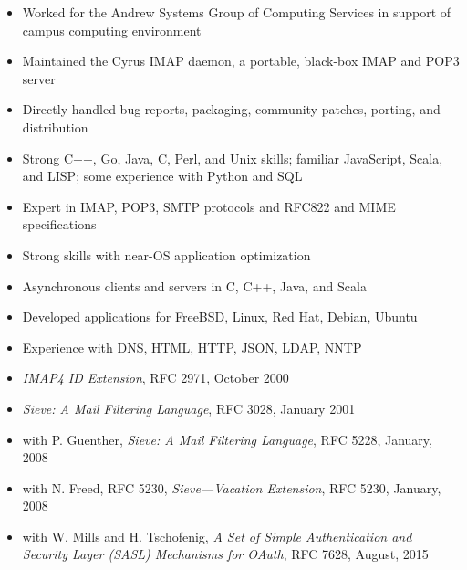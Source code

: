\documentclass[letterpaper,11pt,twoside]{article}
\begin{document}
\vspace{-11pt}
\begin{itemize}
\item Worked for the Andrew Systems Group of Computing Services in
  support of campus computing environment
\item Maintained the Cyrus IMAP daemon, a portable, black-box IMAP and
  POP3 server
\item Directly handled bug reports, packaging, community patches,
  porting, and distribution
\end{itemize}


\vspace{-6pt}
\begin{itemize}
\item Strong C++, Go, Java, C, Perl, and Unix skills; familiar JavaScript,
  Scala, and LISP; some experience with Python and SQL
\item Expert in IMAP, POP3, SMTP protocols and RFC822 and MIME specifications
\item Strong skills with near-OS application optimization
\item Asynchronous clients and servers in C, C++, Java, and Scala
\item Developed applications for FreeBSD, Linux, Red Hat, Debian, Ubuntu
\item Experience with DNS, HTML, HTTP, JSON, LDAP, NNTP
\end{itemize}

\vspace{-6pt}
\begin{itemize}
\item {\sl IMAP4 ID Extension}, RFC 2971, October 2000
\item {\sl Sieve: A Mail Filtering Language}, RFC 3028, January 2001
\item with P. Guenther, {\sl Sieve: A Mail Filtering Language}, RFC
  5228, January, 2008
\item with N. Freed, RFC 5230, {\sl Sieve---Vacation Extension}, RFC
  5230, January, 2008
\item with W. Mills and H. Tschofenig, {\sl A Set of Simple Authentication and
  Security Layer (SASL) Mechanisms for OAuth}, RFC 7628, August, 2015
\end{itemize}
\end{document}
